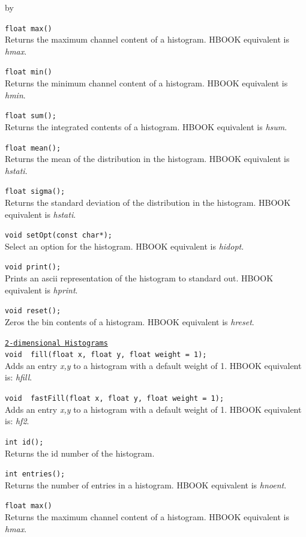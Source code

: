 \documentclass[twoside]{article}
\newcommand{\comp}[1]{\texttt{#1}}%
\newcommand{\entrylabel}[1]{\mbox{\textbf{{#1}}}\hfil}%
\newenvironment{entry}
{\begin{list}{}%
    {\renewcommand{\makelabel}{\entrylabel}%
     \setlength{\labelwidth}{90pt}%
     \setlength{\leftmargin}{\labelwidth}
     \advance\leftmargin by \labelsep%
      }%
    }%
  {\end{list}}
\newcommand{\Entrylabel}[1]%
{\raisebox{0pt}[1ex][0pt]{\makebox[\labelwidth][l]%
    {\parbox[t]{\labelwidth}{\hspace{0pt}\textbf{{#1}}}}}}
\newenvironment{Entry}%
{\renewcommand{\entrylabel}{\Entrylabel}\begin{entry}}%
  {\end{entry}}
\begin{document}
\begin{Entry}
  \verb+float max()+\\
  Returns the maximum channel content of a histogram.  HBOOK equivalent
  is {\em hmax}.

  \verb+float min()+\\
  Returns the minimum channel content of a histogram.  HBOOK equivalent
  is {\em hmin}.
  
  \verb+float sum();+\\
  Returns the integrated contents of a histogram.  HBOOK equivalent
  is {\em hsum}.

  \verb+float mean();+\\
  Returns the mean of the distribution in the histogram.
  HBOOK equivalent is {\em hstati}.
  
  \verb+float sigma();+\\
  Returns the standard deviation of the distribution in the histogram.
  HBOOK equivalent is {\em hstati}.
  
  \verb+void setOpt(const char*);+\\
  Select an option for the histogram.  HBOOK equivalent is {\em hidopt}.
  
  \verb+void print();+\\
  Prints an ascii representation of the histogram to standard out.
  HBOOK equivalent is {\em hprint}.
  
  \verb+void reset();+\\
  Zeros the bin contents of a histogram.  HBOOK equivalent is {\em hreset}.

  \comp{\underline{2-dimensional Histograms}}\\
  \verb+void  fill(float x, float y, float weight = 1);+\\
  Adds an entry {\em x,y} to a histogram with a default weight of 1.
  HBOOK equivalent is: {\em hfill}.

  \verb+void  fastFill(float x, float y, float weight = 1);+\\
  Adds an entry {\em x,y} to a histogram with a default weight of 1.
  HBOOK equivalent is: {\em hf2}.

  \verb+int id();+\\
  Returns the id number of the histogram. 

  \verb+int entries();+\\
  Returns the number of entries in a histogram.  HBOOK equivalent
  is {\em  hnoent}.
  
  \verb+float max()+\\
  Returns the maximum channel content of a histogram.  HBOOK equivalent
  is {\em hmax}.


\end{Entry}
\end{document}
